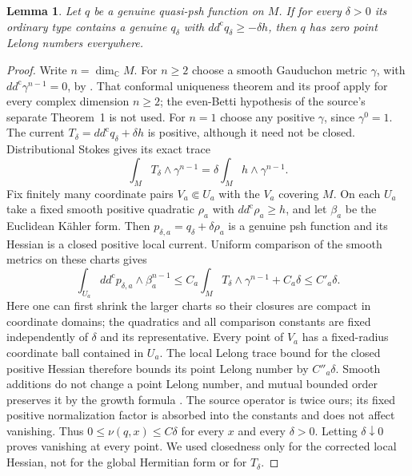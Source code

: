 \documentclass[11pt]{article}
\newtheorem{lemma}[theorem]{Lemma}
\theoremstyle{remark}
\newcommand{\ddc}{dd^{\mathrm c}}
\begin{document}
\begin{lemma}\label{lem:automatic}
Let $q$ be a genuine quasi-psh function on $M$. If for every $\delta>0$
its ordinary type contains a genuine $q_\delta$ with
$\ddc q_\delta\geq-\delta h$, then $q$ has zero point Lelong numbers
everywhere.
\end{lemma}
\begin{proof}
Write $n=\dim_{\mathbb C}M$. For $n\geq2$ choose a smooth Gauduchon
metric $\gamma$, with $\ddc\gamma^{n-1}=0$, by
\cite[Theorem~2]{Gauduchon}. That conformal uniqueness theorem and its proof
apply for every complex dimension $n\geq2$; the even-Betti hypothesis of the source's separate
Theorem~1 is not used. For $n=1$ choose any positive $\gamma$, since
$\gamma^0=1$. The current $T_\delta=\ddc q_\delta+\delta h$ is positive,
although it need not be closed. Distributional Stokes gives its exact trace
\[
 \int_M T_\delta\wedge\gamma^{n-1}
       =\delta\int_M h\wedge\gamma^{n-1}.
\]
Fix finitely many coordinate pairs $V_a\Subset U_a$ with the $V_a$
covering $M$. On each $U_a$ take a fixed smooth positive quadratic
$\rho_a$ with $\ddc\rho_a\geq h$, and let $\beta_a$ be the Euclidean
K\"ahler form. Then $p_{\delta,a}=q_\delta+\delta\rho_a$ is a genuine
psh function and its Hessian is a closed positive local current. Uniform
comparison of the smooth metrics on these charts gives
\[
 \int_{U_a}\ddc p_{\delta,a}\wedge\beta_a^{n-1}
 \leq C_a\int_M T_\delta\wedge\gamma^{n-1}+C_a\delta
 \leq C'_a\delta.
\]
Here one can first shrink the larger charts so their closures are compact
in coordinate domains; the quadratics and all comparison constants are
fixed independently of $\delta$ and its representative. Every point of
$V_a$ has a fixed-radius coordinate ball contained in $U_a$.
The local Lelong trace bound
\cite[III.5.5--5.8]{DemaillyBook} for the closed positive Hessian therefore
bounds its point Lelong number by $C''_a\delta$. Smooth additions do not
change a point Lelong number, and mutual bounded order preserves it by
the growth formula \cite[III.6.9(c)]{DemaillyBook}. The source operator is
twice ours; its fixed positive normalization factor is absorbed into the
constants and does not affect vanishing. Thus $0\leq\nu(q,x)\leq C\delta$
for every $x$ and every $\delta>0$. Letting $\delta\downarrow0$ proves
vanishing at every point. We used closedness only for the corrected local
Hessian, not for the global Hermitian form or for $T_\delta$.
\end{proof}
\end{document}
